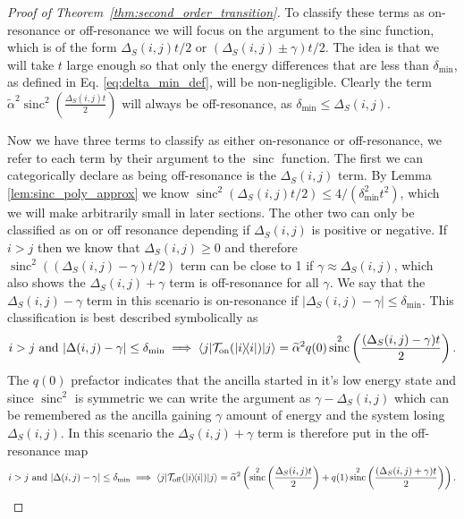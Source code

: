 \documentclass[
 amsmath,amssymb,
 aps,
onecolumn, 
nofootinbib]{revtex4-2}
\newcommand{\on}{\rm on}
\newcommand{\off}{\rm off}
\newcommand{\ket}[1]{|#1\rangle}
\newcommand{\bra}[1]{\langle #1|}
\newcommand{\ketbra}[2]{| #1\rangle\! \langle #2|}
\DeclareMathOperator{\sinc}{sinc}
\begin{document}
\begin{proof}[Proof of Theorem~\ref{thm:second_order_transition}]
    To classify these terms as on-resonance or off-resonance we will focus on the argument to the sinc function, which is of the form $\Delta_S(i,j) t/ 2$ or $(\Delta_S(i,j) \pm \gamma) t/ 2$. The idea is that we will take $t$ large enough so that only the energy differences that are less than $\delta_{\min}$, as defined in Eq. \eqref{eq:delta_min_def}, will be non-negligible. Clearly the term $\widetilde{\alpha}^2 \sinc^2 \left( \frac{\Delta_S(i,j)t}{2} \right)$ will always be off-resonance, as $\delta_{\min} \le \Delta_S(i,j)$. 
    
    Now we have three terms to classify as either on-resonance or off-resonance, we refer to each term by their argument to the $\sinc$ function. The first we can categorically declare as being off-resonance is the $\Delta_S(i,j)$ term. By Lemma \ref{lem:sinc_poly_approx} we know $\sinc^2(\Delta_S(i,j) t/ 2) \le 4 / (\delta_{\min}^2 t^2)$, which we will make arbitrarily small in later sections. The other two can only be classified as on or off resonance depending if $\Delta_S(i,j)$ is positive or negative. If $i > j$ then we know that $\Delta_S(i,j) \ge 0$ and therefore $\sinc^2((\Delta_S(i,j) - \gamma)t/2)$ term can be close to 1 if $\gamma \approx \Delta_{S}(i,j)$, which also shows the $\Delta_S(i,j) + \gamma$ term is off-resonance for all $\gamma$. We say that the $\Delta_S(i,j) - \gamma$ term in this scenario is on-resonance if $|\Delta_S(i,j) - \gamma| \le \delta_{\min}$. This classification is best described symbolically as
    \begin{equation}
    i > j \text{ and } |\Delta(i,j) - \gamma| \le \delta_{\min} \implies  \bra{j} \mathcal{T}_{\on}(\ketbra{i}{i}) \ket{j} = \widetilde{\alpha}^2 q(0) \sinc^2 \left( \frac{(\Delta_S(i,j) - \gamma)t}{2} \right).\label{eq:on_resonance_i_geq_j}
    \end{equation}
    The $q(0)$ prefactor indicates that the ancilla started in it's low energy state and since $\sinc^2$ is symmetric we can write the argument as $\gamma - \Delta_S(i,j)$ which can be remembered as the ancilla gaining $\gamma$ amount of energy and the system losing $\Delta_S(i,j)$. In this scenario the $\Delta_S(i,j) + \gamma$ term is therefore put in the off-resonance map
    \begin{align}
        i > j \text{ and } |\Delta(i,j) - \gamma| \le \delta_{\min} \implies  \bra{j} \mathcal{T}_{\off}(\ketbra{i}{i}) \ket{j} = \widetilde{\alpha}^2\left( \sinc^2 \left( \frac{\Delta_S(i,j) t}{2} \right) + q(1) \sinc^2 \left(\frac{(\Delta_S(i,j) + \gamma) t}{2} \right) \right).
    \end{align}
    

\end{proof}
\end{document}
